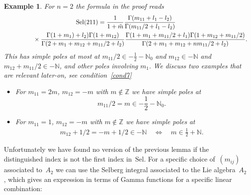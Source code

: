 \documentclass[10pt,a4paper]{amsart}
\numberwithin{equation}{section}
\newtheorem{ese}[teo]{Example}
\newcommand{\N}{\mathbb{N}}
\newcommand{\Z}{\mathbb{Z}}
\newcommand{\Sel}{\mathrm{Sel}}
\begin{document}
\begin{ese}For $n=2$ the formula in the proof reads
	\begin{gather*}
	 \Sel(211)
	=\frac{1}{1+\tilde{m}}\frac{\Gamma(m_{11}+l_1-l_2)}{\Gamma(m_{11}/2+l_1-l_2)} \\
\hphantom{\Sel(211)=}{}
\times \frac{\Gamma(1+m_1)+l_2)\Gamma(1+m_{12})}
	{\Gamma(2+m_1+m_{12}+m_{11}/2+l_2)}
	\frac{\Gamma(1+m_1+m_{11}/2+l_1)\Gamma(1+m_{12}+m_{11}/2)}
	{\Gamma(2+m_1+m_{12}+nm_{11}/2+l_2)}.
	\end{gather*}
	This has simple poles at most at $m_{11}/2\in -\frac{1}{2}-\N_0$ and $m_{12}\in -\N$ and $m_{12}+m_{11}/2\in -\N$, and other poles involving $m_1$. We discuss two examples that are relevant later-on, see condition~\eqref{cond7}
	\begin{itemize}\itemsep=0pt
		\item For $m_{11}=2m$, $m_{12}=-m$ with $m\not\in \Z$ we have simple poles at \[m_{11}/2=m\in -\frac{1}{2}-\N_0.\]
		\item For $m_{11}=1$, $m_{12}=-m$ with $m\not\in \Z$ we have simple poles at
		\begin{gather*}
	m_{12}+1/2=-m+1/2  \in -\N\quad
			\Leftrightarrow\quad m \in\frac{1}{2}+\N.
		\end{gather*}
	\end{itemize}
\end{ese}

Unfortunately we have found no version of the previous lemma if the distinguished index is not the first index in~$\Sel$. For a specific choice of~$(m_{ij})$ associated to~$A_2$ we can use the Selberg integral associated to the Lie algebra~$A_2$ \cite{TV03,War09}, which gives an expression in terms of Gamma functions for a specific linear combination:
\end{document}

